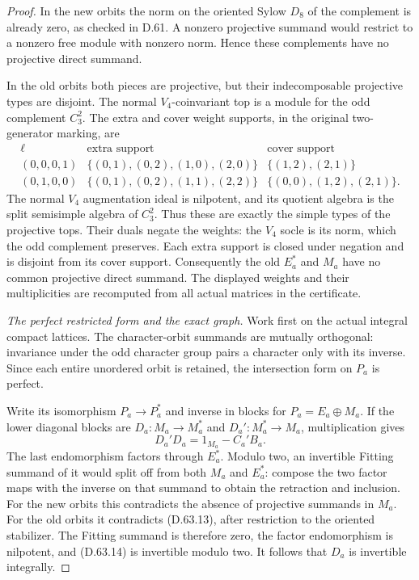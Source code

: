 \begin{proof}
In the new orbits the norm on the oriented
Sylow \(D_8\) of the complement is already zero,
as checked in D.61. A nonzero projective summand
would restrict to a nonzero free module with
nonzero norm. Hence these complements have no
projective direct summand.

In the old orbits both pieces are projective, but
their indecomposable projective types are disjoint.
The normal \(V_4\)-coinvariant top is a module for
the odd complement \(C_3^2\). The extra and cover
weight supports, in the original two-generator
marking, are
\[
 \begin{array}{c|c|c}
 \ell&\text{extra support}&\text{cover support}\\\hline
 (0,0,0,1)&\{(0,1),(0,2),(1,0),(2,0)\}
                       &\{(1,2),(2,1)\}\\
 (0,1,0,0)&\{(0,1),(0,2),(1,1),(2,2)\}
                       &\{(0,0),(1,2),(2,1)\}.
 \end{array}
 \tag{D.63.13}
\]
The normal \(V_4\) augmentation ideal is nilpotent,
and its quotient algebra is the split semisimple
algebra of \(C_3^2\). Thus these are exactly the
simple types of the projective tops. Their duals
negate the weights: the \(V_4\) socle is its norm,
which the odd complement preserves. Each extra
support is closed under negation and is disjoint
from its cover support. Consequently the old
\(E_a^*\) and \(M_a\) have no common projective
direct summand. The displayed weights and their
multiplicities are recomputed from all actual
matrices in the certificate.

\emph{The perfect restricted form and the exact graph.}
Work first on the actual integral compact lattices.
The character-orbit summands are mutually orthogonal:
invariance under the odd character group pairs a
character only with its inverse. Since each entire
unordered orbit is retained, the intersection form
on \(P_a\) is perfect.

Write its isomorphism \(P_a\to P_a^*\) and inverse
in blocks for \(P_a=E_a\oplus M_a\). If the lower
diagonal blocks are \(D_a:M_a\to M_a^*\) and
\(D_a':M_a^*\to M_a\), multiplication gives
\[
                     D_a'D_a=1_{M_a}-C_a'B_a.
 \tag{D.63.14}
\]
The last endomorphism factors through \(E_a^*\).
Modulo two, an invertible Fitting summand of it
would split off from both \(M_a\) and \(E_a^*\):
compose the two factor maps with the inverse on
that summand to obtain the retraction and inclusion.
For the new orbits this contradicts the absence
of projective summands in \(M_a\). For the old
orbits it contradicts (D.63.13), after restriction
to the oriented stabilizer. The Fitting summand
is therefore zero, the factor endomorphism is
nilpotent, and (D.63.14) is invertible modulo two.
It follows that \(D_a\) is invertible integrally.


\end{proof}
